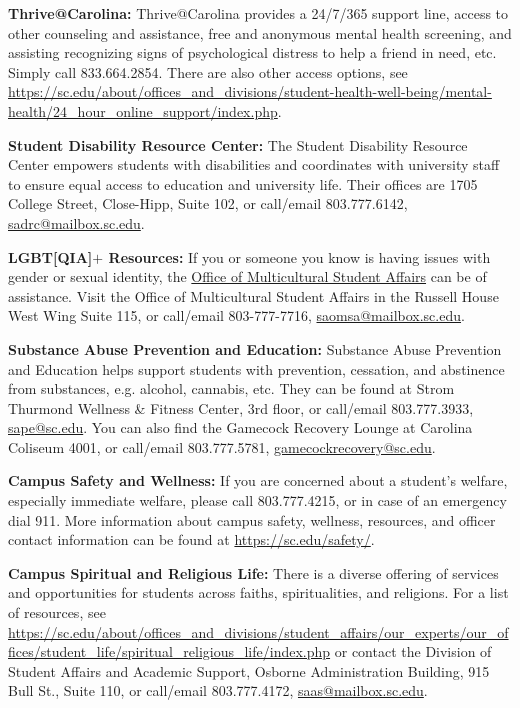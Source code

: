 \documentclass[11pt,letterpaper]{article}
\newcommand{\colortext}[1]{{\bfseries\color{scred}#1}}
\newcommand{\pspecial}{\par\vspace{0.3\baselineskip}}
\begin{document}
\colortext{Thrive@Carolina:} Thrive@Carolina provides a 24/7/365 support line, access to other counseling and assistance, free and anonymous mental health screening, and assisting recognizing signs of psychological distress to help a friend in need, etc. Simply call 833.664.2854. There are also other access options, see \url{https://sc.edu/about/offices\_and\_divisions/student-health-well-being/mental-health/24\_hour\_online\_support/index.php}. \pspecial

\colortext{Student Disability Resource Center:} The Student Disability Resource Center empowers students with disabilities and coordinates with university staff to ensure equal access to education and university life. Their offices are 1705 College Street, Close-Hipp, Suite 102, or call/email 803.777.6142, \href{mailto:sadrc@mailbox.sc.edu}{sadrc@mailbox.sc.edu}. \pspecial

\colortext{LGBT[QIA]$+$ Resources:} If you or someone you know is having issues with gender or sexual identity, the \href{https://sc.edu/about/offices\_and\_divisions/multicultural\_student\_affairs/lgbtqplus-at-uofsc/index.php}{Office of Multicultural Student Affairs} can be of assistance. Visit the Office of Multicultural Student Affairs in the Russell House West Wing Suite 115, or call/email 803-777-7716, \href{mailto:saomsa@mailbox.sc.edu}{saomsa@mailbox.sc.edu}. \pspecial

\colortext{Substance Abuse Prevention and Education:} Substance Abuse Prevention and Education helps support students with prevention, cessation, and abstinence from substances, e.g. alcohol, cannabis, etc. They can be found at Strom Thurmond Wellness \& Fitness Center, 3rd floor, or call/email 803.777.3933, \href{mailto:sape@sc.edu}{sape@sc.edu}. You can also find the Gamecock Recovery Lounge at Carolina Coliseum 4001, or call/email 803.777.5781, \href{mailto:gamecockrecovery@sc.edu}{gamecockrecovery@sc.edu}. \pspecial



\newpage



\colortext{Campus Safety and Wellness:} If you are concerned about a student's welfare, especially immediate welfare, please call 803.777.4215, or in case of an emergency dial 911. More information about campus safety, wellness, resources, and officer contact information can be found at \url{https://sc.edu/safety/}. \pspecial

\colortext{Campus Spiritual and Religious Life:} There is a diverse offering of services and opportunities for students across faiths, spiritualities, and religions. For a list of resources, see \url{https://sc.edu/about/offices\_and\_divisions/student\_affairs/our\_experts/our\_offices/student\_life/spiritual\_religious\_life/index.php} or contact the Division of Student Affairs and Academic Support, Osborne Administration Building, 915 Bull St., Suite 110, or call/email 803.777.4172, \href{mailto:saas@mailbox.sc.edu}{saas@mailbox.sc.edu}. \vfill
\end{document}
